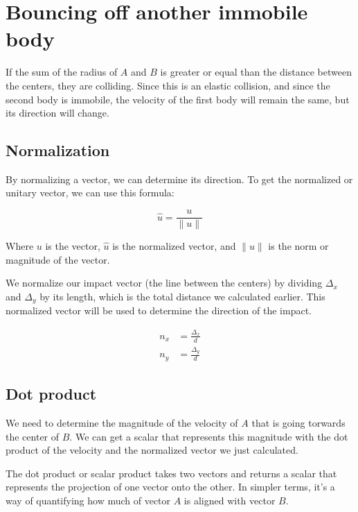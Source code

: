 \documentclass{amsart}
\begin{document}
\newpage

\section{Bouncing off another immobile body}

If the sum of the radius of \(A\) and \(B\) is greater or equal than the
distance between the centers, they are colliding. Since this is an elastic
collision, and since the second body is immobile, the velocity of the first body
will remain the same, but its direction will change.

\subsection{Normalization}

By normalizing a vector, we can determine its direction. To get the normalized
or unitary vector, we can use this formula:

\begin{displaymath}
  \hat{u} = \frac{u}{\|u\|}
\end{displaymath}

Where \(u\) is the vector, \(\hat{u}\) is the normalized vector, and \(\|u\|\)
is the norm or magnitude of the vector.

We normalize our impact vector (the line between the centers) by dividing
\(\Delta_x\) and \(\Delta_y\) by its length, which is the total distance we
calculated earlier. This normalized vector will be used to determine the
direction of the impact.

\begin{align*}
  n_x &= \frac{\Delta_x}{d} \\
  n_y &= \frac{\Delta_y}{d}
\end{align*}

\subsection{Dot product}

We need to determine the magnitude of the velocity of \(A\) that is going
torwards the center of \(B\). We can get a scalar that represents this magnitude
with the dot product of the velocity and the normalized vector we just
calculated.

The dot product or scalar product takes two vectors and returns a scalar that
represents the projection of one vector onto the other. In simpler terms, it's a
way of quantifying how much of vector \(A\) is aligned with vector \(B\).
\end{document}
